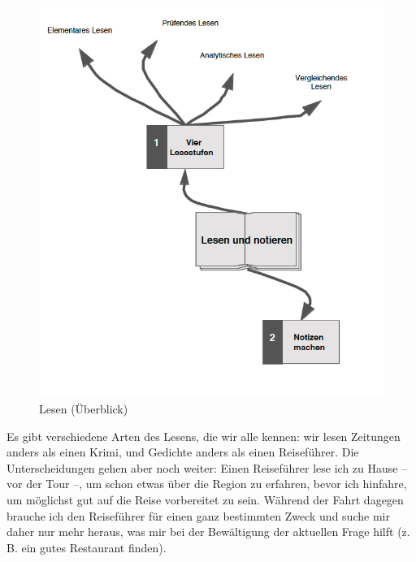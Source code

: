 \documentclass[]{book}
\theoremstyle{definition}
\theoremstyle{definition}
\theoremstyle{definition}
\theoremstyle{remark}
\begin{document}
\begin{figure}

{\centering \includegraphics{images/lesen-min} 

}

\caption{Lesen (Überblick)}\label{fig:unnamed-chunk-15}
\end{figure}

Es gibt verschiedene Arten des Lesens, die wir alle kennen: wir lesen
Zeitungen anders als einen Krimi, und Gedichte anders als einen
Reiseführer. Die Unterscheidungen gehen aber noch weiter: Einen
Reiseführer lese ich zu Hause -- vor der Tour --, um schon etwas über
die Region zu erfahren, bevor ich hinfahre, um möglichst gut auf die
Reise vorbereitet zu sein. Während der Fahrt dagegen brauche ich den
Reiseführer für einen ganz bestimmten Zweck und suche mir daher nur mehr
heraus, was mir bei der Bewältigung der aktuellen Frage hilft (z. B. ein
gutes Restaurant finden).
\end{document}
